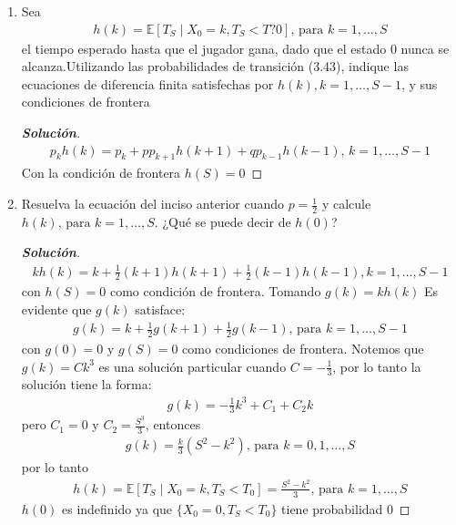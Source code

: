 \documentclass[12pt, letterpaper]{article}
\newenvironment{manualtheorem}[1]{%
  \renewcommand\themanualtheoreminner{#1}%
  \manualtheoreminner
}{\endmanualtheoreminner}
\newenvironment{solucion}
  {\renewcommand\qedsymbol{$\square$}\begin{proof}[\textbf{Solución}]}
  {\end{proof}}
\begin{document}
\begin{manualtheorem}{3.2}
\begin{enumerate}
        \item Sea
        \begin{align*}
            h(k)=\mathbb{E}[T_S\mid X_0=k,T_S<T?0]\textrm{, para }k=1,\dots,S
        \end{align*}
        el tiempo esperado hasta que el jugador gana, dado que el estado 0 nunca se alcanza.Utilizando las probabilidades de transición (3.43), indique las ecuaciones de diferencia finita satisfechas por $h(k), k=1,\dots,S-1$, y sus condiciones de frontera
        \begin{solucion}
            \begin{align*}
                p_kh(k)=p_k+pp_{k+1}h(k+1)+qp_{k-1}h(k-1)\textrm{, }k=1,\dots,S-1
            \end{align*}
            Con la condición de frontera $h(S)=0$
        \end{solucion}
        
        \item Resuelva la ecuación del inciso anterior cuando $p=\frac{1}{2}$ y calcule $h(k)\textrm{, para }k=1,\dots,S$. ¿Qué se puede decir de $h(0)$?
        \begin{solucion}
            \begin{align*}
                kh(k)=k+\frac{1}{2}(k+1)h(k+1)+\frac{1}{2}(k-1)h(k-1), k=1,\dots,S-1
            \end{align*}
            con $h(S)=0$ como condición de frontera. Tomando $g(k)=kh(k)$ Es evidente que $g(k)$ satisface:
            \begin{align*}
                g(k)=k+\frac{1}{2}g(k+1)+\frac{1}{2}g(k-1)\textrm{, para }k=1,\dots,S-1
            \end{align*}
            con $g(0)=0$ y $g(S)=0$ como condiciones de frontera. Notemos que $g(k)=Ck^3$ es una solución particular cuando $C=-\frac{1}{3}$, por lo tanto la solución tiene la forma:
            \begin{align*}
                g(k)=-\frac{1}{3}k^3+C_1+C_2k
            \end{align*}
            pero $C_1=0$ y $C_2=\frac{S^3}{3}$, entonces
            \begin{align*}
                g(k)=\frac{k}{3}(S^2-k^2)\textrm{, para }k=0,1,\dots,S
            \end{align*}
            por lo tanto
            \begin{align*}
                h(k)=\mathbb{E}[T_S\mid X_0=k,T_S<T_0]=\frac{S^2-k^2}{3}\textrm{, para }k=1,\dots,S
            \end{align*}
            $h(0)$ es indefinido ya que $\{X_0=0,T_S<T_0 \}$ tiene probabilidad 0
        \end{solucion}
    \end{enumerate}
    \end{manualtheorem}
    
\end{document}
